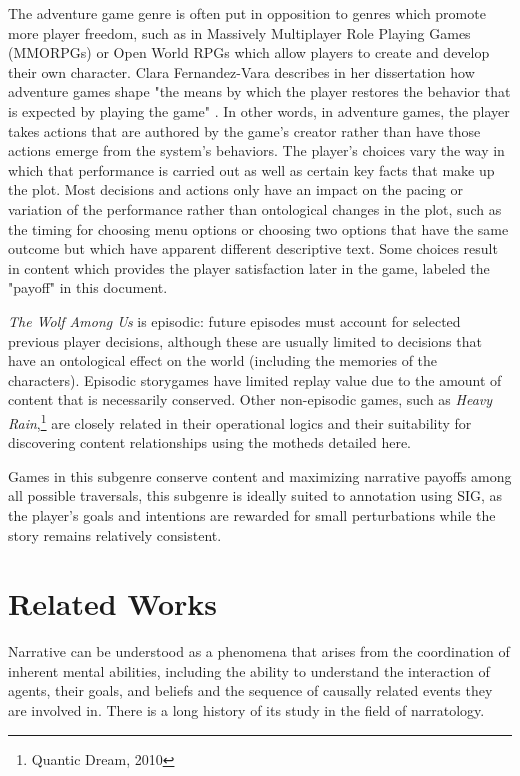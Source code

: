 The adventure game genre is often put in opposition to genres which
promote more player freedom, such as in Massively Multiplayer Role
Playing Games (MMORPGs) or Open World RPGs which allow players to
create and develop their own character. Clara Fernandez-Vara describes
in her dissertation how adventure games shape "the means by which the
player restores the behavior that is expected by playing the game"
\cite{ClaraFernandez-Vara2009}. In other words, in adventure games,
the player takes actions that are authored by the game's creator
rather than have those actions emerge from the system's behaviors. The
player's choices vary the way in which that performance is carried out
as well as certain key facts that make up the plot. Most decisions and
actions only have an impact on the pacing or variation of the
performance rather than ontological changes in the plot, such as the
timing for choosing menu options or choosing two options that have the
same outcome but which have apparent different descriptive text. Some
choices result in content which provides the player satisfaction later
in the game, labeled the "payoff" in this document.

\emph{The Wolf Among Us} is episodic: future episodes must account for
selected previous player decisions, although these are usually limited
to decisions that have an ontological effect on the world (including
the memories of the characters). Episodic storygames have limited
replay value due to the amount of content that is necessarily
conserved. Other non-episodic games, such as \emph{Heavy Rain},\footnote{Quantic Dream, 2010} are
closely related in their operational logics and their suitability for
discovering content relationships using the motheds detailed here.

Games in this subgenre conserve content and maximizing narrative
payoffs among all possible traversals, this subgenre is ideally suited
to annotation using SIG, as the player's goals and intentions are
rewarded for small perturbations while the story remains relatively
consistent.

\section{Related Works}
\label{sec:orgheadline3}
Narrative can be understood as a phenomena that arises from the
coordination of inherent mental abilities, including the ability to
understand the interaction of agents, their goals, and beliefs and the
sequence of causally related events they are involved in. There is a
long history of its study in the field of narratology. 

